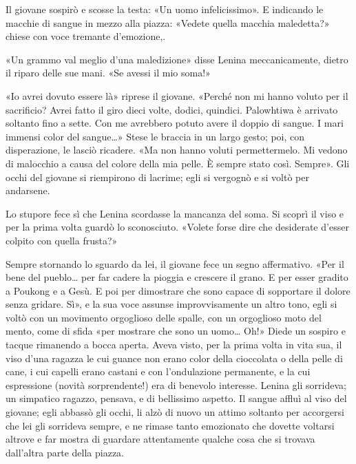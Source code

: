 \documentclass[
a5paper, %
10pt, %
twoside, 
onecolumn, %
openany, %
]{memoir}
\begin{document}
Il giovane sospirò e scosse la testa: «Un uomo infelicissimo». E indicando le macchie di sangue in mezzo alla piazza: «Vedete quella macchia maledetta?» chiese con voce tremante d’emozione,.

«Un grammo val meglio d’una maledizione» disse Lenina meccanicamente, dietro il riparo delle sue mani. «Se avessi il mio soma!»

«Io avrei dovuto essere là» riprese il giovane. «Perché non mi hanno voluto per il sacrificio? Avrei fatto il giro dieci volte, dodici, quindici. Palowhtiwa è arrivato soltanto fino a sette. Con me avrebbero potuto avere il doppio di sangue. I mari immensi color del sangue…» Stese le braccia in un largo gesto; poi, con disperazione, le lasciò ricadere. «Ma non hanno voluti permettermelo. Mi vedono di malocchio a causa del colore della mia pelle. È sempre stato così. Sempre». Gli occhi del giovane si riempirono di lacrime; egli si vergognò e si voltò per andarsene.

Lo stupore fece sì che Lenina scordasse la mancanza del soma. Si scoprì il viso e per la prima volta guardò lo sconosciuto. «Volete forse dire che desiderate d’esser colpito con quella frusta?»

Sempre stornando lo sguardo da lei, il giovane fece un segno affermativo. «Per il bene del pueblo… per far cadere la pioggia e crescere il grano. E per esser gradito a Poukong e a Gesù. E poi per dimostrare che sono capace di sopportare il dolore senza gridare. Sì», e la sua voce assunse improvvisamente un altro tono, egli si voltò con un movimento orgoglioso delle spalle, con un orgoglioso moto del mento, come di sfida «per mostrare che sono un uomo… Oh!» Diede un sospiro e tacque rimanendo a bocca aperta. Aveva visto, per la prima volta in vita sua, il viso d’una ragazza le cui guance non erano color della cioccolata o della pelle di cane, i cui capelli erano castani e con l’ondulazione permanente, e la cui espressione (novità sorprendente!) era di benevolo interesse. Lenina gli sorrideva; un simpatico ragazzo, pensava, e di bellissimo aspetto. Il sangue affluì al viso del giovane; egli abbassò gli occhi, li alzò di nuovo un attimo soltanto per accorgersi che lei gli sorrideva sempre, e ne rimase tanto emozionato che dovette voltarsi altrove e far mostra di guardare attentamente qualche cosa che si trovava dall’altra parte della piazza.
\end{document}

